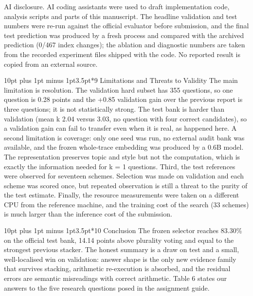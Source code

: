 \documentclass[10pt,a4paper]{article}
\makeatletter
\renewcommand\section{\@startsection{section}{1}{\z@}%
  {10pt plus 1pt minus 1pt}{3.5pt}{\normalfont\large\bfseries}}
\makeatother
\begin{document}
AI disclosure. AI coding assistants were used to draft implementation code, analysis scripts and parts of this manuscript. The headline validation and test numbers were re-run against the official evaluator before submission, and the final test prediction was produced by a fresh process and compared with the archived prediction (0/467 index changes); the ablation and diagnostic numbers are taken from the recorded experiment files shipped with the code. No reported result is copied from an external source.

\section*{9 Limitations and Threats to Validity}
The main limitation is resolution. The validation hard subset has 355 questions, so one question is 0.28 points and the +0.85 validation gain over the previous report is three questions; it is not statistically strong. The test bank is harder than validation (mean k 2.04 versus 3.03, no question with four correct candidates), so a validation gain can fail to transfer even when it is real, as happened here. A second limitation is coverage: only one seed was run, no external audit bank was available, and the frozen whole-trace embedding was produced by a 0.6B model. The representation preserves topic and style but not the computation, which is exactly the information needed for k = 1 questions. Third, the test references were observed for seventeen schemes. Selection was made on validation and each scheme was scored once, but repeated observation is still a threat to the purity of the test estimate. Finally, the resource measurements were taken on a different CPU from the reference machine, and the training cost of the search (33 schemes) is much larger than the inference cost of the submission.

\section*{10 Conclusion}
The frozen selector reaches 83.30\% on the official test bank, 14.14 points above plurality voting and equal to the strongest previous stacker. The honest summary is a draw on test and a small, well-localised win on validation: answer shape is the only new evidence family that survives stacking, arithmetic re-execution is absorbed, and the residual errors are semantic misreadings with correct arithmetic. Table 6 states our answers to the five research questions posed in the assignment guide.
\end{document}
